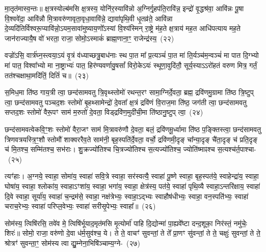मा॒तृत॑मास्व॒न्तः॥ क्ष॒त्रस्योल्ब॑मसि क्ष॒त्रस्य॒ योनि॑र॒स्यावि॑न्नो अ॒ग्निर्गृ॒हप॑ति॒रावि॑न्न॒ इन्द्रो॑ वृ॒द्धश्र॑वा॒ आवि॑न्नः पू॒षा वि॒श्ववे॑दा॒ आवि॑न्नौ मि॒त्रावरु॑णावृता॒वृधा॒वावि॑न्ने॒ द्यावा॑\-पृथि॒वी धृ॒तव्र॑ते॒ आवि॑न्ना दे॒व्यदि॑तिर्विश्वरू॒प्यावि॑न्नो॒\-ऽयम॒सावा॑मुष्याय॒णो᳚\-ऽस्यां वि॒श्य॑स्मिन् रा॒ष्ट्रे म॑ह॒ते क्ष॒त्राय॑ मह॒त आधि॑पत्याय मह॒ते जान॑राज्यायै॒ष वो॑ भरता॒ राजा॒ सोमो॒\-ऽस्माकं॑ ब्राह्म॒णाना॒ꣳ॒ राजेन्द्र॑स्य॒~(२२)

वज्रो॑\-ऽसि॒ वार्त्र॑घ्न॒स्त्वया॒\-ऽयं वृ॒त्रं व॑ध्याच्छत्रु॒बाध॑नाः स्थ पा॒त मा᳚ प्र॒त्यञ्चं॑ पा॒त मा॑ ति॒र्यञ्च॑म॒न्वञ्चं॑ मा पात दि॒ग्भ्यो मा॑ पात॒ विश्वा᳚भ्यो मा ना॒ष्ट्राभ्यः॑ पात॒ हिर॑ण्यवर्णावु॒षसां᳚ विरो॒के\-ऽयः॑ स्थूणा॒वुदि॑तौ॒ सूर्य॒स्या\-ऽऽ\-रो॑हतं वरुण मित्र॒ गर्तं॒ तत॑श्चक्षाथा॒मदि॑तिं॒ दितिं॑ च॥~(२३)

{\anuvakamend[{शिशु॒रिन्द्र॒स्यैक॑चत्वारिꣳशच्च}]}%

स॒मिध॒मा ति॑ष्ठ गाय॒त्री त्वा॒ छन्द॑सामवतु त्रि॒वृथ्स्तोमो॑ रथन्त॒रꣳ सामा॒ग्निर्दे॒वता॒ ब्रह्म॒ द्रवि॑णमु॒ग्रामा ति॑ष्ठ त्रि॒ष्टुप् त्वा॒ छन्द॑सामवतु पञ्चद॒शः स्तोमो॑ बृ॒हथ्सामेन्द्रो॑ दे॒वता᳚ क्ष॒त्रं द्रवि॑णं वि॒राज॒मा ति॑ष्ठ॒ जग॑ती त्वा॒ छन्द॑सामवतु सप्तद॒शः स्तोमो॑ वैरू॒पꣳ साम॑ म॒रुतो॑ दे॒वता॒ विड्द्रवि॑ण॒मुदी॑ची॒मा ति॑ष्ठानु॒ष्टुप् त्वा॒~(२४)

छन्द॑सामवत्वेकवि॒ꣳ॒शः स्तोमो॑ वैरा॒जꣳ साम॑ मि॒त्रावरु॑णौ दे॒वता॒ बलं॒ द्रवि॑णमू॒र्ध्वामा ति॑ष्ठ प॒ङ्क्तिस्त्वा॒ छन्द॑सामवतु त्रिणवत्रयस्त्रि॒ꣳ॒शौ स्तोमौ॑ शाक्वररैव॒ते साम॑नी॒ बृह॒स्पति॑र्दे॒वता॒ वर्चो॒ द्रवि॑णमी॒दृङ् चा᳚न्या॒दृङ् चै॑ता॒दृङ् च॑ प्रति॒दृङ् च॑ मि॒तश्च॒ सम्मि॑तश्च॒ सभ॑राः। शु॒क्रज्यो॑तिश्च चि॒त्रज्यो॑तिश्च स॒त्यज्यो॑तिश्च॒ ज्योति॑ष्माꣴश्च स॒त्यश्च॑र्त॒पाश्चा-~(२५)

त्यꣳ॑हाः। अ॒ग्नये॒ स्वाहा॒ सोमा॑य॒ स्वाहा॑ सवि॒त्रे स्वाहा॒ सर॑स्वत्यै॒ स्वाहा॑ पू॒ष्णे स्वाहा॒ बृह॒स्पत॑ये॒ स्वाहेन्द्रा॑य॒ स्वाहा॒ घोषा॑य॒ स्वाहा॒ श्लोका॑य॒ स्वाहा\-ऽꣳशा॑य॒ स्वाहा॒ भगा॑य॒ स्वाहा॒ क्षेत्र॑स्य॒ पत॑ये॒ स्वाहा॑ पृथि॒व्यै स्वाहा॒\-ऽन्तरि॑क्षाय॒ स्वाहा॑ दि॒वे स्वाहा॒ सूर्या॑य॒ स्वाहा॑ च॒न्द्रम॑से॒ स्वाहा॒ नक्ष॑त्रेभ्यः॒ स्वाहा॒\-ऽद्भ्यः स्वाहौष॑धीभ्यः॒ स्वाहा॒ वन॒स्पति॑भ्यः॒ स्वाहा॑ चराच॒रेभ्यः॒ स्वाहा॑ परिप्ल॒वेभ्यः॒ स्वाहा॑ सरीसृ॒पेभ्यः॒ स्वाहा᳚॥~(२६)

{\anuvakamend[{अ॒नु॒ष्टुप्त्व॑र्त॒पाश्च॑ सरीसृ॒पेभ्यः॒ स्वाहा᳚}]}%

सोम॑स्य॒ त्विषि॑रसि॒ तवे॑व मे॒ त्विषि॑र्भूयाद॒मृत॑मसि मृ॒त्योर्मा॑ पाहि दि॒द्योन्मा॑ पा॒ह्यवे᳚ष्टा दन्द॒शूका॒ निर॑स्तं॒ नमु॑चेः॒ शिरः॑॥ सोमो॒ राजा॒ वरु॑णो दे॒वा ध॑र्म॒सुव॑श्च॒ ये। ते ते॒ वाचꣳ॑ सुवन्तां॒ ते ते᳚ प्रा॒णꣳ सु॑वन्तां॒ ते ते॒ चक्षुः॑ सुवन्तां॒ ते ते॒ श्रोत्रꣳ॑ सुवन्ता॒ꣳ॒ सोम॑स्य त्वा द्यु॒म्नेना॒भिषि॑ञ्चाम्य॒ग्ने-~(२७)

